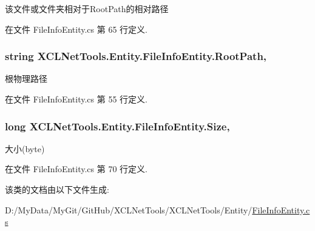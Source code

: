 该文件或文件夹相对于\-Root\-Path的相对路径 



在文件 File\-Info\-Entity.\-cs 第 65 行定义.

\hypertarget{class_x_c_l_net_tools_1_1_entity_1_1_file_info_entity_a6ef4c659747c605379a43168ae1d64f6}{
\subsubsection[{Root\-Path}]{\setlength{\rightskip}{0pt plus 5cm}string X\-C\-L\-Net\-Tools.\-Entity.\-File\-Info\-Entity.\-Root\-Path\hspace{0.3cm}{\ttfamily [get]}, {\ttfamily [set]}}}\label{class_x_c_l_net_tools_1_1_entity_1_1_file_info_entity_a6ef4c659747c605379a43168ae1d64f6}


根物理路径 



在文件 File\-Info\-Entity.\-cs 第 55 行定义.

\hypertarget{class_x_c_l_net_tools_1_1_entity_1_1_file_info_entity_a7447a43994e75793388e160a626ba346}{
\subsubsection[{Size}]{\setlength{\rightskip}{0pt plus 5cm}long X\-C\-L\-Net\-Tools.\-Entity.\-File\-Info\-Entity.\-Size\hspace{0.3cm}{\ttfamily [get]}, {\ttfamily [set]}}}\label{class_x_c_l_net_tools_1_1_entity_1_1_file_info_entity_a7447a43994e75793388e160a626ba346}


大小(byte) 



在文件 File\-Info\-Entity.\-cs 第 70 行定义.



该类的文档由以下文件生成\-:\begin{DoxyCompactItemize}
\item 
D\-:/\-My\-Data/\-My\-Git/\-Git\-Hub/\-X\-C\-L\-Net\-Tools/\-X\-C\-L\-Net\-Tools/\-Entity/\hyperlink{_file_info_entity_8cs}{File\-Info\-Entity.\-cs}\end{DoxyCompactItemize}

